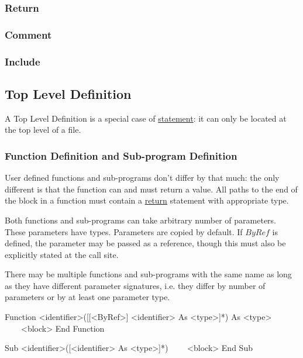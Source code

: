 \subsubsection{Return}
\label{stat:return}

\subsubsection{Comment}
\label{stat:comment}

\subsubsection{Include}
\label{stat:include}


\subsection{Top Level Definition}
\label{tld}
A Top Level Definition is a special case of \hyperref[statement]{statement}:
it can only be located at the top level of a file.

\subsubsection{Function Definition and Sub-program Definition}
\label{tld:funcdef}
User defined functions and sub-programs don't differ by that much:
the only different is that the function can and must return a value.
All paths to the end of the block in a function must contain a \hyperref[stat:return]{return} statement
with appropriate type.

Both functions and sub-programs can take arbitrary number of parameters.
These parameters have types.
Parameters are copied by default.
If $ByRef$ is defined, the parameter may be passed as a reference,
though this must also be explicitly stated at the call site.

There may be multiple functions and sub-programs with the same name
as long as they have different parameter signatures, i.e.
they differ by number of parameters or by at least one parameter type.

\begin{grammar}
Function <identifier>([[<ByRef>] <identifier> As <type>]*) As <type>
~~~~<block>
End Function

Sub <identifier>([<identifier> As <type>]*)
~~~~<block>
End Sub
\end{grammar}
